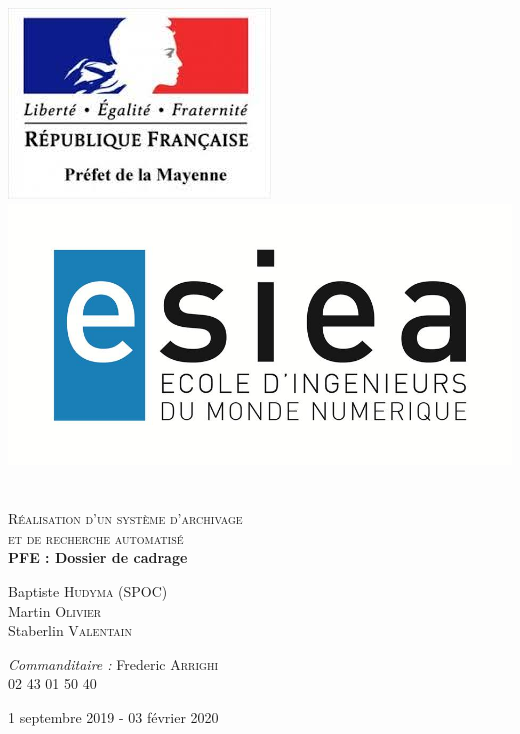 \begin{titlepage}
\begin{center}

\includegraphics [scale=0.70] {images/logoPref.jpeg} \includegraphics [scale=0.35] {images/ESIEA.JPG} ~\\[1.5cm] 

\textsc {\LARGE }\\[2cm]
\textsc {\large Réalisation d'un système d'archivage \\et de recherche automatisé }\\[1.5cm]

\vspace{0.4cm}
{ \LARGE \bfseries PFE : Dossier de cadrage\\[0.4cm] }

\vspace{5cm}

\begin{minipage}{0.4\textwidth}
\begin{flushleft} \large
	Baptiste \textsc{Hudyma} (SPOC)\\
	Martin \textsc{Olivier}\\
	Staberlin \textsc{Valentain}
\end{flushleft}
\end{minipage}
\begin{minipage}{0.5\textwidth}
\begin{flushright} \large
	\emph{Commanditaire :} Frederic \textsc{Arrighi}\\
	02 43 01 50 40
\end{flushright}
\end{minipage}

\vfill

{\large 1\ier{} septembre 2019 - 03 février 2020}

\end{center}
\end{titlepage}
